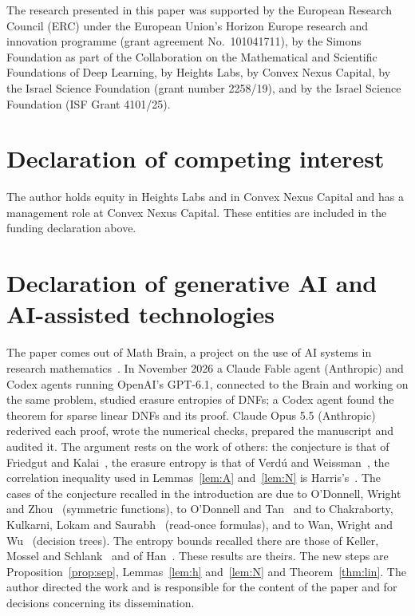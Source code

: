 \documentclass[11pt]{amsart}
\theoremstyle{remark}
\begin{document}
The research presented in this paper was supported by the European Research Council (ERC) under the European Union's
Horizon Europe research and innovation programme (grant agreement No.~101041711), by the Simons Foundation as part of
the Collaboration on the Mathematical and Scientific Foundations of Deep Learning, by Heights Labs, by Convex Nexus
Capital, by the Israel Science Foundation (grant number 2258/19), and by the Israel Science Foundation (ISF Grant
4101/25).

\section*{Declaration of competing interest}
The author holds equity in Heights Labs and in Convex Nexus Capital and has a management role at Convex Nexus Capital.
These entities are included in the funding declaration above.

\section*{Declaration of generative AI and AI-assisted technologies}
The paper comes out of Math Brain, a project on the use of AI systems in research mathematics~\cite{BrainFramework,MathBrainRepo}. In November 2026 a
Claude Fable agent (Anthropic) and Codex agents running OpenAI's GPT-6.1, connected to the Brain and working on the same
problem, studied erasure entropies of DNFs; a Codex agent found the theorem for sparse linear DNFs and its proof.
Claude Opus 5.5 (Anthropic) rederived each proof, wrote the numerical checks, prepared the manuscript and audited it.
The argument rests on the work of others: the conjecture is that of Friedgut and Kalai~\cite{FK96}, the erasure
entropy is that of Verd\'u and Weissman~\cite{VW08}, the correlation inequality used in Lemmas~\ref{lem:A}
and~\ref{lem:N} is Harris's~\cite{Harris}. The cases of the conjecture recalled in the introduction are due to
O'Donnell, Wright and Zhou~\cite{OWZ} (symmetric functions), to O'Donnell and Tan~\cite{OT13} and to Chakraborty,
Kulkarni, Lokam and Saurabh~\cite{CKLS} (read-once formulas), and to Wan, Wright and Wu~\cite{WWW} (decision trees).
The entropy bounds recalled there are those of Keller, Mossel and Schlank~\cite{KMS} and of Han~\cite{Han}. These
results are theirs. The new steps are Proposition~\ref{prop:sep}, Lemmas~\ref{lem:h} and~\ref{lem:N} and
Theorem~\ref{thm:lin}. The author directed the work and is responsible for the content of the paper and for decisions concerning its dissemination.
\end{document}
